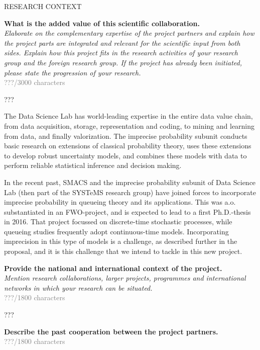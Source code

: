 \documentclass[11pt,dvipsnames,usenames,a4paper]{article}
\begin{document}
\vspace{5mm}

\begin{shaded}\centering RESEARCH CONTEXT \end{shaded}
\textbf{What is the added value of this scientific collaboration.}\\
\textit{Elaborate on the complementary expertise of the project partners and explain how the project parts are integrated and relevant for the scientific input from both sides. Explain how this project fits in the research activities of your research group and the foreign research group. If the project has already been initiated, please state the progression of your research.}\\
\textcolor{Gray}{???/3000 characters}

???




The Data Science Lab has world-leading expertise in the entire data value chain, from data acquisition, storage, representation and coding, to mining and learning from data, and finally valorization. The imprecise probability subunit conducts basic research on extensions of classical probability theory, uses these extensions to develop robust uncertainty models, and combines these models with data to perform reliable statistical inference and decision making.

In the recent past, SMACS and the imprecise probability subunit of Data Science Lab (then part of the SYSTeMS research group) have  joined forces to incorporate imprecise probability in queueing theory and its applications. This was a.o. substantiated in an FWO-project, and is expected to lead to a first Ph.D.-thesis in 2016. That project focussed on discrete-time stochastic processes, while queueing studies frequently adopt continuous-time models. Incorporating imprecision in this type of models is a challenge, as described further in the proposal, and it is this challenge that we intend to tackle in this new project.

\textbf{Provide the national and international context of the project.}\\
\textit{Mention research collaborations, larger projects, programmes and international networks in which your research can be situated.}\\
\textcolor{Gray}{???/1800 characters}

???

\textbf{Describe the past cooperation between the project partners.}\\
\textcolor{Gray}{???/1800 characters}
\end{document}
